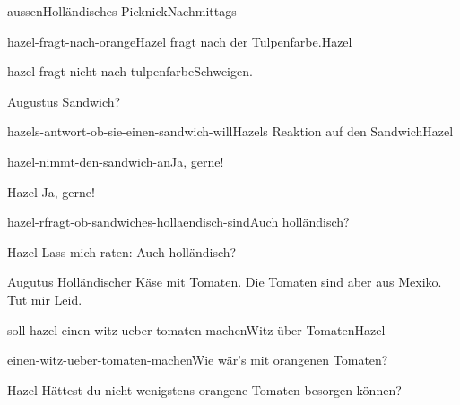 \documentclass[12pt]{article}
\begin{document}
\begin{scene}{aussen}{Holländisches Picknick}{Nachmittags}
\begin{decision}{hazel-fragt-nach-orange}{\gls{Hazel} fragt nach der Tulpenfarbe.}{Hazel}
            \begin{option}{hazel-fragt-nicht-nach-tulpenfarbe}{Schweigen.}
            \end{option}
        \end{decision}


        \begin{dialog}{Augustus}
            Sandwich?
        \end{dialog}

        \begin{decision}{hazels-antwort-ob-sie-einen-sandwich-will}{\gls{Hazel}s Reaktion auf den Sandwich}{Hazel}
            \begin{option}{hazel-nimmt-den-sandwich-an}{Ja, gerne!}
                \begin{dialog}{Hazel}
                    Ja, gerne!
                \end{dialog}
            \end{option}

            \begin{option}{hazel-rfragt-ob-sandwiches-hollaendisch-sind}{Auch holländisch?}
                \begin{dialog}{Hazel}
                    Lass mich raten: Auch holländisch?
                \end{dialog}
            \end{option}
        \end{decision}

        \begin{dialog}{Augutus}
            Holländischer Käse mit Tomaten. Die Tomaten sind aber aus Mexiko. Tut mir Leid.
        \end{dialog}


        \begin{decision}{soll-hazel-einen-witz-ueber-tomaten-machen}{Witz über Tomaten}{Hazel}
            \begin{option}{einen-witz-ueber-tomaten-machen}{Wie wär's mit orangenen Tomaten?}
                \begin{dialog}{Hazel}
                    Hättest du nicht wenigstens orangene Tomaten besorgen können?
                \end{dialog}

            \end{option}


\end{decision}
\end{scene}
\end{document}
